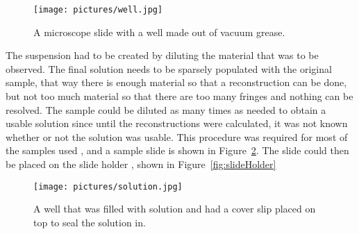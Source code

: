 \begin{figure}[htbp!]
\begin{center}
    \texttt{[image: pictures/well.jpg]}
\end{center}
\caption{A microscope slide with a well made out of vacuum grease.}
\label{fig:well}
\end{figure}

The suspension had to be created by diluting the material that was to be
observed.
The final solution needs to be
sparsely populated with the original sample, that way there is enough material
so that a reconstruction can be done, but not too much material so that there
are too many fringes and nothing can be resolved.
%
%
The sample could be diluted as many
times as needed to obtain a usable solution since until the reconstructions were
calculated, it was not known whether or not the solution was usable.
This procedure was required for most of the
samples used%
, and a sample slide is shown in Figure~\ref{fig:solutionSlide}.
The slide could then be
placed on the slide holder%
, shown in Figure~\ref{fig:slideHolder}

\begin{figure}[htbp!]
\begin{center}
    \texttt{[image: pictures/solution.jpg]}
\end{center}
\caption{A well that was filled with solution and had a cover slip placed on
top to seal the solution in.}
\label{fig:solutionSlide}
\end{figure}
%
%


